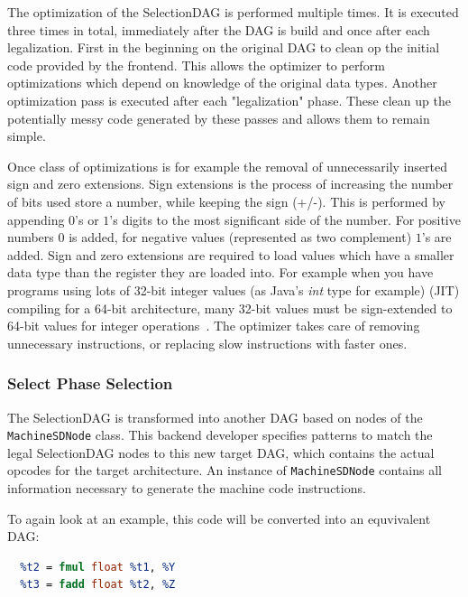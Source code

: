 The optimization of the SelectionDAG is performed multiple times.
It is executed three times in total, immediately after the DAG is build and once after each legalization.
First in the beginning on the original DAG to clean op the initial code provided by the frontend.
This allows the optimizer to perform optimizations  which depend on knowledge of the original data types.
Another optimization pass is executed after each "legalization" phase. These clean up 
the potentially messy code generated by these passes and allows them to remain simple.

Once class of optimizations is for example the removal of unnecessarily inserted sign and zero extensions.
Sign extensions is the process of increasing the number of bits used store a number, while keeping the sign (+/-).
This is performed by appending $0$'s or $1$'s digits to the most significant side of the number. For positive numbers
$0$ is added, for negative values (represented as two complement) $1$'s are added.
Sign and zero extensions are required to load values which have a smaller data type than the register they are loaded into.
For example when you have programs using lots of 32-bit integer values (as Java's \textit{int} type for example) 
(JIT) compiling for a 64-bit architecture, many 32-bit values must be sign-extended to 64-bit values 
for integer operations~\cite{Kawahito:2002:ESE:543552.512552}.
The optimizer takes care of removing unnecessary instructions, or replacing slow instructions with faster ones.

\subsubsection{Select Phase Selection}

The SelectionDAG is transformed into another DAG based on nodes of the \lstinline[language=c++]{MachineSDNode} class.
This backend developer specifies patterns to match the legal SelectionDAG nodes to this new target DAG, which contains 
the actual opcodes for the target architecture.
An instance of \lstinline[language=c++]{MachineSDNode} contains all information 
necessary to generate the machine code instructions.

To again look at an example, this code will be converted into an equvivalent DAG:
\begin{lstlisting}[language=LLVM,label={lst:llvm_example}]
  %t1 = fadd float %W, %X
  %t2 = fmul float %t1, %Y
  %t3 = fadd float %t2, %Z
\end{lstlisting}

